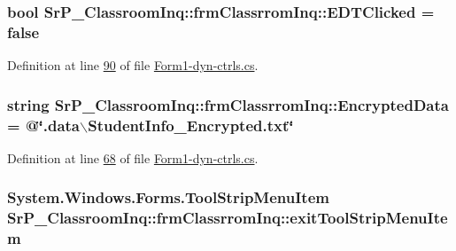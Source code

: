 \hypertarget{class_sr_p___classroom_inq_1_1frm_classrrom_inq_a2f126b875f216c20427f6818976a9465}{
\subsubsection[{\-E\-D\-T\-Clicked}]{\setlength{\rightskip}{0pt plus 5cm}bool {\bf \-Sr\-P\-\_\-\-Classroom\-Inq\-::frm\-Classrrom\-Inq\-::\-E\-D\-T\-Clicked} = false}}
\label{class_sr_p___classroom_inq_1_1frm_classrrom_inq_a2f126b875f216c20427f6818976a9465}


\-Definition at line \hyperlink{_form1-dyn-ctrls_8cs_source_l00090}{90} of file \hyperlink{_form1-dyn-ctrls_8cs_source}{\-Form1-\/dyn-\/ctrls.\-cs}.

\hypertarget{class_sr_p___classroom_inq_1_1frm_classrrom_inq_a3128c84ccd476a8a2e02bedab0ecc031}{
\subsubsection[{\-Encrypted\-Data}]{\setlength{\rightskip}{0pt plus 5cm}string {\bf \-Sr\-P\-\_\-\-Classroom\-Inq\-::frm\-Classrrom\-Inq\-::\-Encrypted\-Data} = @\char`\"{}.data$\backslash$\-Student\-Info\-\_\-\-Encrypted.\-txt\char`\"{}}}
\label{class_sr_p___classroom_inq_1_1frm_classrrom_inq_a3128c84ccd476a8a2e02bedab0ecc031}


\-Definition at line \hyperlink{_form1-dyn-ctrls_8cs_source_l00068}{68} of file \hyperlink{_form1-dyn-ctrls_8cs_source}{\-Form1-\/dyn-\/ctrls.\-cs}.

\hypertarget{class_sr_p___classroom_inq_1_1frm_classrrom_inq_a676112a698472361a000699f774d38ca}{
\subsubsection[{exit\-Tool\-Strip\-Menu\-Item}]{\setlength{\rightskip}{0pt plus 5cm}\-System.\-Windows.\-Forms.\-Tool\-Strip\-Menu\-Item {\bf \-Sr\-P\-\_\-\-Classroom\-Inq\-::frm\-Classrrom\-Inq\-::exit\-Tool\-Strip\-Menu\-Item}}}
\label{class_sr_p___classroom_inq_1_1frm_classrrom_inq_a676112a698472361a000699f774d38ca}


